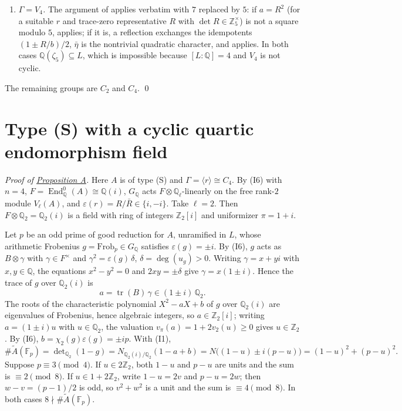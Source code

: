 \documentclass[11pt]{article}
\newcommand{\Q}{\mathbb Q}
\newcommand{\Z}{\mathbb Z}
\newcommand{\F}{\mathbb F}
\DeclareMathOperator{\End}{End}
\DeclareMathOperator{\tr}{tr}
\begin{document}
\begin{enumerate}
\item \emph{\(\Gamma=V_4\).} The argument of \cite[Section~7, case \(V_4\)]{P63} applies verbatim with
\(7\) replaced by \(5\): if \(a=R^2\) (for a suitable \(r\) and trace-zero representative \(R\)
with \(\det R\in\Z_5^\times\)) is not a square modulo \(5\), \cite[Lemma~6]{P63} applies; if it is, a
reflection exchanges the idempotents \((1\pm R/b)/2\), \(\bar\eta\) is the nontrivial quadratic
character, and \cite[Lemma~7]{P63} applies. In both cases \(\Q(\zeta_5)\subseteq L\), which is
impossible because \([L:\Q]=4\) and \(V_4\) is not cyclic.
\end{enumerate}
The remaining groups are \(C_2\) and \(C_4\). \qed

\section{Type (S) with a cyclic quartic endomorphism field}\label{quartic}

\emph{Proof of \hyperref[prop-A]{Proposition A}.} Here \(A\) is of type (S) and
\(\Gamma=\langle r\rangle\cong C_4\). By (I6) with \(n=4\), \(F=\End^0_{\Q}(A)\cong\Q(i)\),
\(G_{\Q}\) acts \(F\otimes\Q_\ell\)-linearly on the free rank-\(2\) module \(V_\ell(A)\), and
\(\varepsilon(r)=R/\bar R\in\{i,-i\}\). Take \(\ell=2\). Then \(F\otimes\Q_2=\Q_2(i)\) is a field
with ring of integers \(\Z_2[i]\) and uniformizer \(\pi=1+i\).

Let \(p\) be an odd prime of good reduction for \(A\), unramified in \(L\), whose arithmetic
Frobenius \(g=\mathrm{Frob}_p\in G_{\Q}\) satisfies \(\varepsilon(g)=\pm i\). By (I6), \(g\) acts as \(B\otimes\gamma\)
with \(\gamma\in F^\times\) and \(\gamma^2=\varepsilon(g)\,\delta\), \(\delta=\deg(u_g)>0\).
Writing \(\gamma=x+yi\) with \(x,y\in\Q\), the equations \(x^2-y^2=0\) and \(2xy=\pm\delta\) give
\(\gamma=x(1\pm i)\). Hence the trace of \(g\) over \(\Q_2(i)\) is
\[a=\tr(B)\,\gamma\in(1\pm i)\,\Q_2 .\]
The roots of the characteristic polynomial \(X^2-aX+b\) of \(g\) over \(\Q_2(i)\) are eigenvalues
of Frobenius, hence algebraic integers, so \(a\in\Z_2[i]\); writing \(a=(1\pm i)u\) with
\(u\in\Q_2\), the valuation \(v_\pi(a)=1+2v_2(u)\ge0\) gives \(u\in\Z_2\). By (I6),
\(b=\chi_2(g)\varepsilon(g)=\pm ip\). With (I1),
\[\#\widetilde A(\F_p)=\det\nolimits_{\Q_2}(1-g)=N_{\Q_2(i)/\Q_2}(1-a+b)
=N\bigl((1-u)\pm i(p-u)\bigr)=(1-u)^2+(p-u)^2 .\]
Suppose \(p\equiv3\pmod4\). If \(u\in2\Z_2\), both \(1-u\) and \(p-u\) are units and the sum is
\(\equiv2\pmod8\). If \(u\in1+2\Z_2\), write \(1-u=2v\) and \(p-u=2w\); then \(w-v=(p-1)/2\) is
odd, so \(v^2+w^2\) is a unit and the sum is \(\equiv4\pmod8\). In both cases
\(8\nmid\#\widetilde A(\F_p)\).
\end{document}
